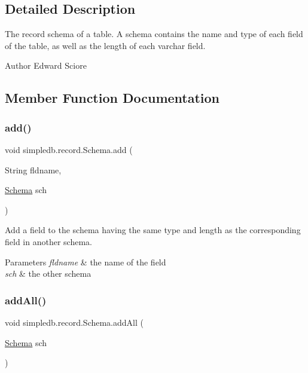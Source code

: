 \subsection{Detailed Description}
The record schema of a table. A schema contains the name and type of each field of the table, as well as the length of each varchar field. \begin{DoxyAuthor}{Author}
Edward Sciore 
\end{DoxyAuthor}


\subsection{Member Function Documentation}
\mbox{\label{classsimpledb_1_1record_1_1Schema_a9848518dc6b8857524ef48ed058491c5}} 
\subsubsection{\texorpdfstring{add()}{add()}}
{\footnotesize\ttfamily void simpledb.\+record.\+Schema.\+add (\begin{DoxyParamCaption}\item[{String}]{fldname,  }\item[{\hyperlink{classsimpledb_1_1record_1_1Schema}{Schema}}]{sch }\end{DoxyParamCaption})\hspace{0.3cm}{\ttfamily [inline]}}

Add a field to the schema having the same type and length as the corresponding field in another schema. 
\begin{DoxyParams}{Parameters}
{\em fldname} & the name of the field \\
\hline
{\em sch} & the other schema \\
\hline
\end{DoxyParams}
\mbox{\label{classsimpledb_1_1record_1_1Schema_a34e19c8e5025c96c2a6b552123139be8}} 
\subsubsection{\texorpdfstring{add\+All()}{addAll()}}
{\footnotesize\ttfamily void simpledb.\+record.\+Schema.\+add\+All (\begin{DoxyParamCaption}\item[{\hyperlink{classsimpledb_1_1record_1_1Schema}{Schema}}]{sch }\end{DoxyParamCaption})\hspace{0.3cm}{\ttfamily [inline]}}

